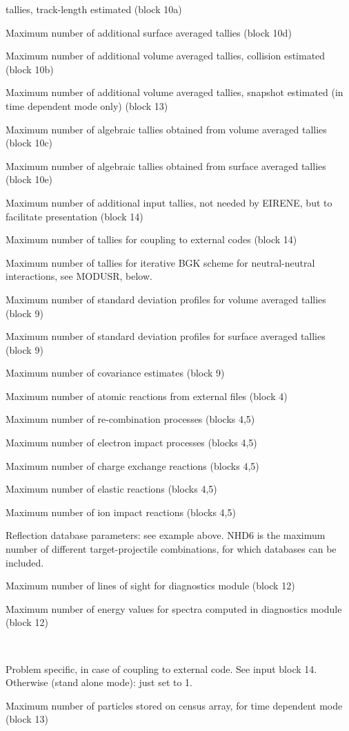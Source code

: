 \begin{list}{ }{}
tallies, track-length estimated (block 10a)
\item[{\bf NADS }] Maximum number of additional surface averaged
tallies  (block 10d)
\item[{\bf NCLV }] Maximum number of additional volume averaged
tallies, collision estimated (block 10b)
\item[{\bf NSNV }] Maximum number of additional volume averaged
tallies, snapshot estimated (in time dependent mode only) (block 13)
\item[{\bf NALV }] Maximum number of algebraic
tallies obtained from volume
averaged tallies (block 10c)
\item[{\bf NALS }] Maximum number of algebraic
tallies obtained from
surface averaged tallies (block 10e)
\item[{\bf NAIN }] Maximum number of additional input tallies, not
needed by EIRENE, but to facilitate presentation (block 14)
\item[{\bf NCOP }] Maximum number of tallies for coupling to external
codes (block 14)
\item[{\bf NBGK }] Maximum number of tallies for iterative BGK scheme
for neutral-neutral interactions, see MODUSR, below.
\item[{\bf NSD }] Maximum number of standard deviation profiles for
volume averaged tallies (block 9)
\item[{\bf NSDW }] Maximum number of standard deviation profiles
for surface averaged tallies (block 9)
\item[{\bf NCV }] Maximum number of covariance estimates (block 9)
\item[{\bf NREAC }] Maximum number of atomic reactions from external
files (block 4)
\item[{\bf NRRC }] Maximum number of re-combination processes (blocks 4,5)
\item[{\bf NREI }] Maximum number of electron impact processes
(blocks 4,5)
\item[{\bf NRCX }] Maximum number of charge exchange reactions (blocks 4,5)
\item[{\bf NREL }] Maximum number of elastic reactions
(blocks 4,5)
\item[{\bf NRPI }] Maximum number of ion impact reactions (blocks 4,5)
\end{list}
Reflection database parameters: see example above. NHD6 is the maximum
number of different target-projectile combinations, for which databases can be included.
\begin{list}{ }{}
\item[{\bf NCHOR }] Maximum number of lines of sight for diagnostics module (block 12)
\item[{\bf NCHEN }] Maximum number of energy values for spectra computed
in diagnostics module (block 12)
\item[{\bf NDX, NDY, NFL }]~

Problem specific, in case of coupling to external code.
See input block 14. Otherwise (stand alone mode): just set to 1.
\item[{\bf NPRNL }] Maximum number of particles stored on census array, for
time dependent mode (block 13)
\end{list}

